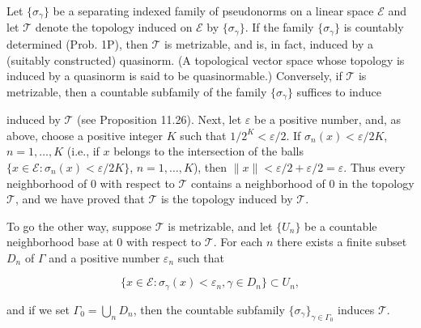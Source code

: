 Let $\{\sigma_{\gamma}\}$ be a separating indexed family of pseudonorms on a linear space $\mathcal{E}$ and let $\mathcal{T}$ denote the topology induced on $\mathcal{E}$ by $\{\sigma_{\gamma}\}$. If the family $\{\sigma_{\gamma}\}$ is countably determined (Prob. 1P), then $\mathcal{T}$ is metrizable, and is, in fact, induced by a (suitably constructed) quasinorm. (A topological vector space whose topology is induced by a quasinorm is said to be quasinormable.) Conversely, if $\mathcal{T}$ is metrizable, then a countable subfamily of the family $\{\sigma_{\gamma}\}$ suffices to induce

induced by $\mathcal{T}$ (see Proposition 11.26). Next, let $\varepsilon$ be a positive number, and, as above, choose a positive integer $K$ such that $1/2^K < \varepsilon/2$. If $\sigma_n(x) < \varepsilon/2K$, $n = 1, \ldots, K$ (i.e., if $x$ belongs to the intersection of the balls $\{x \in \mathcal{E} : \sigma_n(x) < \varepsilon/2K\}$, $n = 1, \ldots, K$), then $\|x\| < \varepsilon/2 + \varepsilon/2 = \varepsilon$. Thus every neighborhood of 0 with respect to $\mathcal{T}$ contains a neighborhood of 0 in the topology $\mathcal{T}$, and we have proved that $\mathcal{T}$ is the topology induced by $\mathcal{T}$.

To go the other way, suppose $\mathcal{T}$ is metrizable, and let $\{U_n\}$ be a countable neighborhood base at 0 with respect to $\mathcal{T}$. For each $n$ there exists a finite subset $D_n$ of $\Gamma$ and a positive number $\varepsilon_n$ such that

$$\{x \in \mathcal{E} : \sigma_\gamma(x) < \varepsilon_n, \gamma \in D_n\} \subset U_n,$$

and if we set $\Gamma_0 = \bigcup_n D_n$, then the countable subfamily $\{\sigma_\gamma\}_{\gamma \in \Gamma_0}$ induces $\mathcal{T}$.
